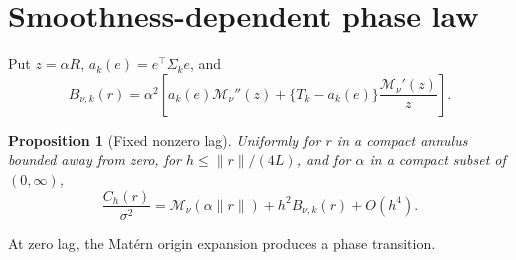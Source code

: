 \documentclass[sigconf]{acmart}
\newtheorem{proposition}{Proposition}
\theoremstyle{remark}
\newcommand{\Matern}{\mathcal M}
\begin{document}
\section{Smoothness-dependent phase law}

Put \(z=\alpha R\), \(a_k(e)=e^\top\Sigma_k e\), and
\begin{equation}
 B_{\nu,k}(r)=\alpha^2\left[
 a_k(e)\Matern_\nu''(z)
 +\{T_k-a_k(e)\}\frac{\Matern_\nu'(z)}{z}\right].
\end{equation}

\begin{proposition}[Fixed nonzero lag]
\label{prop:fixed-lag}
Uniformly for \(r\) in a compact annulus bounded away from zero, for
\(h\leq\lVert r\rVert/(4L)\), and for \(\alpha\) in a compact subset of
\((0,\infty)\),
\begin{equation}
  \frac{C_h(r)}{\sigma^2}
  =\Matern_\nu(\alpha\lVert r\rVert)+h^2B_{\nu,k}(r)+O(h^4).
  \label{eq:lag}
\end{equation}
\end{proposition}

At zero lag, the Matérn origin expansion produces a phase transition.
\end{document}
